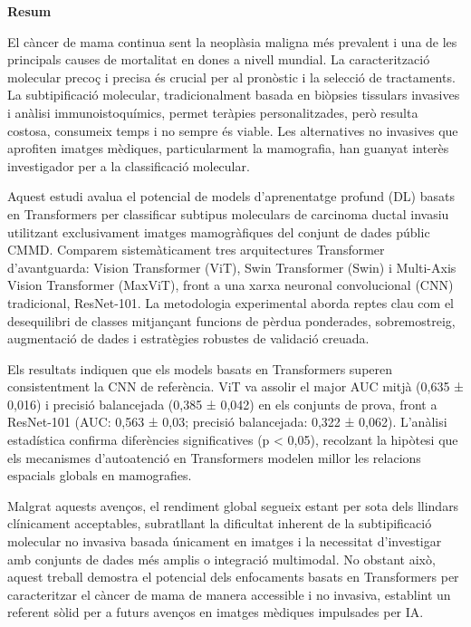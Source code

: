 \documentclass[a4paper,10pt]{book}
\begin{document}

\newpage
{}
\noindent \textbf{\large Resum}

El càncer de mama continua sent la neoplàsia maligna més prevalent i una de les principals causes de mortalitat en dones a nivell mundial. La caracterització molecular precoç i precisa és crucial per al pronòstic i la selecció de tractaments. La subtipificació molecular, tradicionalment basada en biòpsies tissulars invasives i anàlisi immunoistoquímics, permet teràpies personalitzades, però resulta costosa, consumeix temps i no sempre és viable. Les alternatives no invasives que aprofiten imatges mèdiques, particularment la mamografia, han guanyat interès investigador per a la classificació molecular.

Aquest estudi avalua el potencial de models d'aprenentatge profund (DL) basats en Transformers per classificar subtipus moleculars de carcinoma ductal invasiu utilitzant exclusivament imatges mamogràfiques del conjunt de dades públic CMMD. Comparem sistemàticament tres arquitectures Transformer d'avantguarda: Vision Transformer (ViT), Swin Transformer (Swin) i Multi-Axis Vision Transformer (MaxViT), front a una xarxa neuronal convolucional (CNN) tradicional, ResNet-101. La metodologia experimental aborda reptes clau com el desequilibri de classes mitjançant funcions de pèrdua ponderades, sobremostreig, augmentació de dades i estratègies robustes de validació creuada.

Els resultats indiquen que els models basats en Transformers superen consistentment la CNN de referència. ViT va assolir el major AUC mitjà (0,635 ± 0,016) i precisió balancejada (0,385 ± 0,042) en els conjunts de prova, front a ResNet-101 (AUC: 0,563 ± 0,03; precisió balancejada: 0,322 ± 0,062). L'anàlisi estadística confirma diferències significatives (p < 0,05), recolzant la hipòtesi que els mecanismes d'autoatenció en Transformers modelen millor les relacions espacials globals en mamografies.

Malgrat aquests avenços, el rendiment global segueix estant per sota dels llindars clínicament acceptables, subratllant la dificultat inherent de la subtipificació molecular no invasiva basada únicament en imatges i la necessitat d'investigar amb conjunts de dades més amplis o integració multimodal. No obstant això, aquest treball demostra el potencial dels enfocaments basats en Transformers per caracteritzar el càncer de mama de manera accessible i no invasiva, establint un referent sòlid per a futurs avenços en imatges mèdiques impulsades per IA.
\end{document}
